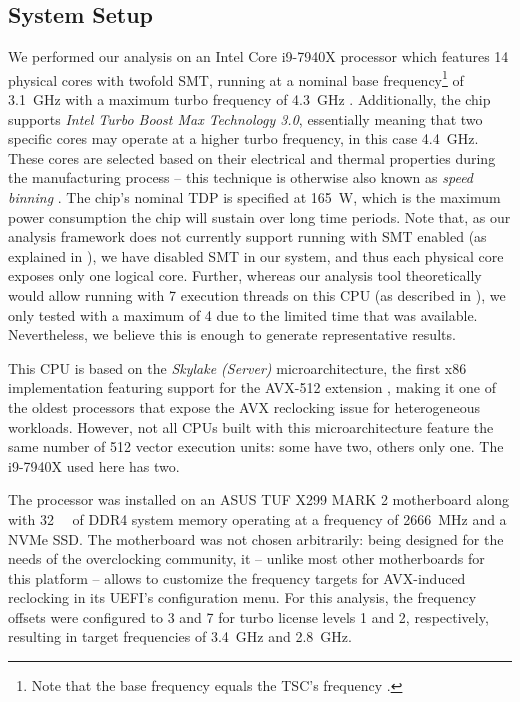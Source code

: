 \subsection{System Setup}
\label{sec:analysis:results:systemsetup}

We performed our analysis on an Intel Core i9-7940X processor which features 14 physical cores with twofold \gls{SMT}, running at a nominal base frequency\footnote{Note that the base frequency equals the \gls{TSC}'s frequency \cite{intelsdmsysprogguide}.} of \SI{3.1}{\giga\hertz} with a maximum turbo frequency of \SI{4.3}{\giga\hertz} \cite{intel7940x}. Additionally, the chip supports \textit{Intel Turbo Boost Max Technology 3.0}, essentially meaning that two specific cores may operate at a higher turbo frequency, in this case \SI{4.4}{\giga\hertz}. These cores are selected based on their electrical and thermal properties during the manufacturing process \cite{intelxeonscalabledeepdive} -- this technique is otherwise also known as \textit{speed binning} \cite{lopata2012speed}. The chip's nominal \gls{TDP} is specified at \SI{165}{\watt}, which is the maximum power consumption the chip will sustain over long time periods. Note that, as our analysis framework does not currently support running with \gls{SMT} enabled (as explained in ), we have disabled \gls{SMT} in our system, and thus each physical core exposes only one logical core. Further, whereas our analysis tool theoretically would allow running with 7 execution threads on this \gls{CPU} (as described in ), we only tested with a maximum of 4 due to the limited time that was available. Nevertheless, we believe this is enough to generate representative results.

This \gls{CPU} is based on the \textit{Skylake (Server)} microarchitecture, the first \gls{x86} implementation featuring support for the \gls{AVX-512} extension \cite{intelxeonscalabledeepdive}, making it one of the oldest processors that expose the \gls{AVX} reclocking issue for heterogeneous workloads. However, not all \glspl{CPU} built with this microarchitecture feature the same number of \SI[number-unit-product=-]{512}{\bit} vector execution units: some have two, others only one. The i9-7940X used here has two.

The processor was installed on an ASUS TUF X299 MARK 2 motherboard along with \SI{32}{\gibi\byte} of DDR4 system memory operating at a frequency of \SI{2666}{\mega\hertz} and a \gls{NVMe} \acrlong{SSD}. The motherboard was not chosen arbitrarily: being designed for the needs of the overclocking community, it -- unlike most other motherboards for this platform -- allows to customize the frequency targets for \gls{AVX}-induced reclocking in its \gls{UEFI}'s configuration menu. For this analysis, the frequency offsets were configured to 3 and 7 for turbo license levels 1 and 2, respectively, resulting in target frequencies of \SI{3.4}{\giga\hertz} and \SI{2.8}{\giga\hertz}.

